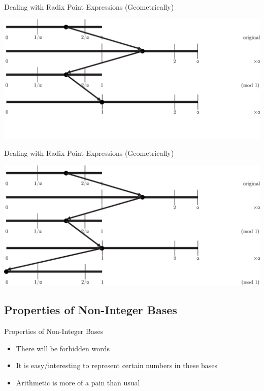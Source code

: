 \documentclass{beamer}
\begin{document}
\begin{frame}{Dealing with Radix Point Expressions (Geometrically)}
  \addtocounter{framenumber}{-1}
  \begin{example}
    \includegraphics[width=\textwidth,height=0.75\textheight]{images/silverratio/4}
  \end{example}
\end{frame}

\begin{frame}{Dealing with Radix Point Expressions (Geometrically)}
  \addtocounter{framenumber}{-1}
  \begin{example}
    \includegraphics[width=\textwidth,height=0.75\textheight]{images/silverratio/5}
  \end{example}
\end{frame}






\subsection{Properties of Non-Integer Bases}
\begin{frame}{Properties of Non-Integer Bases}
  \begin{itemize}
    \item There will be forbidden words \pause
    \item It is easy/interesting to represent certain numbers in these bases \pause
    \item Arithmetic is more of a pain than usual
  \end{itemize}
\end{frame}
\end{document}
